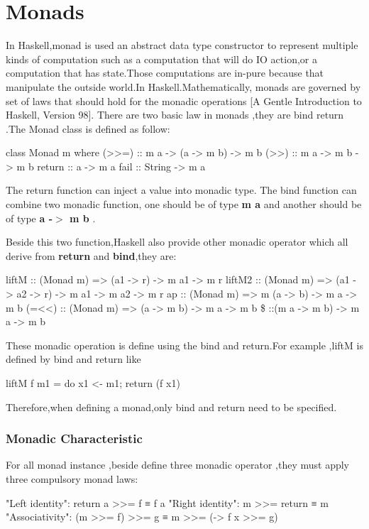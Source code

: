 \section{Monads}
In Haskell,monad is used an abstract data type constructor to represent multiple kinds of computation such as a computation that will do IO action,or a computation that has state.Those computations are in-pure because that manipulate the outside world.In Haskell.Mathematically, monads are governed by set of laws that should hold for the monadic operations [A Gentle Introduction to Haskell, Version 98]. There are two basic law in monads ,they are bind return .The Monad class is defined as follow:
\begin{hcode}
class Monad m where
  (>>=) :: m a -> (a -> m b) -> m b
  (>>) :: m a -> m b -> m b
  return :: a -> m a
  fail :: String -> m a
\end{hcode}

The return function can inject a value into monadic type.
The bind function can combine two monadic function, one should be of type \textbf{m a} and another should be of type \textbf{a -$>$ m b} .

Beside this two function,Haskell also provide other monadic operator which all derive from \textbf{return} and \textbf{bind},they are:
\begin{hexample}
liftM :: (Monad m) => (a1 -> r) -> m a1 -> m r
liftM2  :: (Monad m) => (a1 -> a2 -> r) -> m a1 -> m a2 -> m r
ap :: (Monad m) => m (a -> b) -> m a -> m b
(=<<) :: (Monad m) => (a -> m b) -> m a -> m b
\$ ::(m a -> m b) -> m a -> m b 
\end{hexample}

These monadic operation is define using the bind and return.For example ,liftM is defined by bind and return like 
\begin{hcode}
liftM f m1              = do { x1 <- m1; return (f x1) }
\end{hcode}
Therefore,when defining a monad,only bind and return need to be specified.

\subsubsection{Monadic Characteristic}
For all monad instance ,beside define three monadic operator ,they must apply three compulsory monad laws:

\begin{hcode}
"Left identity": return a >>= f  ≡  f a
"Right identity": m >>= return  ≡  m
"Associativity": (m >>= f) >>= g  ≡  m >>= (\x -> f x >>= g)
\end{hcode}

